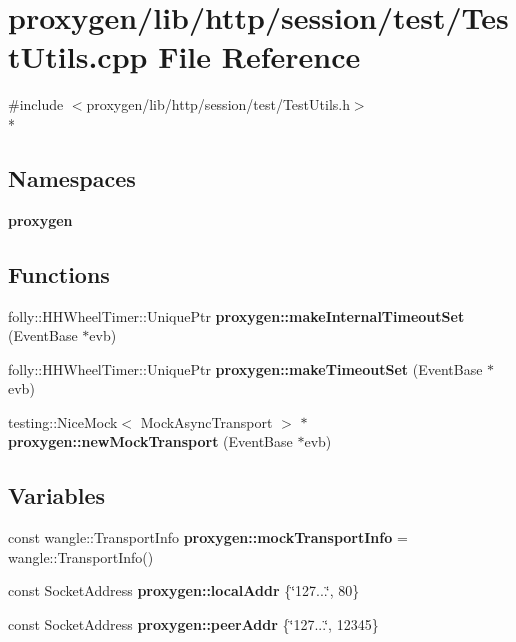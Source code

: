 \section{proxygen/lib/http/session/test/\+Test\+Utils.cpp File Reference}
\label{session_2test_2TestUtils_8cpp}
{\ttfamily \#include $<$proxygen/lib/http/session/test/\+Test\+Utils.\+h$>$}\\*
\subsection*{Namespaces}
\begin{DoxyCompactItemize}
\item 
 {\bf proxygen}
\end{DoxyCompactItemize}
\subsection*{Functions}
\begin{DoxyCompactItemize}
\item 
folly\+::\+H\+H\+Wheel\+Timer\+::\+Unique\+Ptr {\bf proxygen\+::make\+Internal\+Timeout\+Set} (Event\+Base $\ast$evb)
\item 
folly\+::\+H\+H\+Wheel\+Timer\+::\+Unique\+Ptr {\bf proxygen\+::make\+Timeout\+Set} (Event\+Base $\ast$evb)
\item 
testing\+::\+Nice\+Mock$<$ Mock\+Async\+Transport $>$ $\ast$ {\bf proxygen\+::new\+Mock\+Transport} (Event\+Base $\ast$evb)
\end{DoxyCompactItemize}
\subsection*{Variables}
\begin{DoxyCompactItemize}
\item 
const wangle\+::\+Transport\+Info {\bf proxygen\+::mock\+Transport\+Info} = wangle\+::\+Transport\+Info()
\item 
const Socket\+Address {\bf proxygen\+::local\+Addr} \{\char`\"{}127...\char`\"{}, 80\}
\item 
const Socket\+Address {\bf proxygen\+::peer\+Addr} \{\char`\"{}127...\char`\"{}, 12345\}
\end{DoxyCompactItemize}
